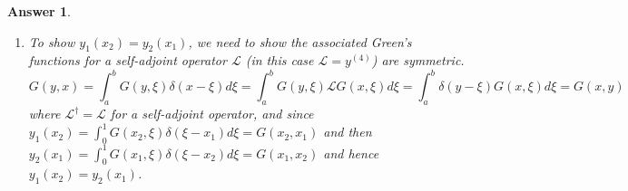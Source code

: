 \documentclass[a4paper]{article}
\newtheorem{ans}{Answer}[section]
\theoremstyle{new}
\begin{document}
\begin{ans}
\begin{enumerate}[label=(\roman*)]
$$\begin{pmatrix}-1&0&1&0&0&0\\0&0&1&1&1&1\\0&0&3&2&1&0\\0&1&0&-1&0&0\\-\xi^3&-\xi^2&\xi^3&\xi^2&\xi&1\\-3\xi^2&-2\xi&3\xi^2&2\xi&1&0\\\end{pmatrix}\begin{pmatrix}c_1\\c_2\\c_5\\c_6\\c_7\\c_8\\\end{pmatrix}=\begin{pmatrix}1/6\\0\\0\\\xi/2\\0\\0\\\end{pmatrix}\implies\begin{pmatrix}c_1\\c_2\\c_5\\c_6\\c_7\\c_8\\\end{pmatrix}=\begin{pmatrix}\frac{1}{6}(-1+3\xi^2-2\xi^3)\\\frac{1}{2}(\xi-2\xi^2+\xi^3)\\\frac{1}{6}(3\xi^2-2\xi^3)\\\frac{1}{2}(-2\xi^2+\xi^3)\\\xi^2/2\\-\xi^3/6\\\end{pmatrix}$$
hence
$$G(x,\xi)=
\left\{
        \begin{array}{ll}
      \frac{1}{6}(-1+3\xi^2-2\xi^3)x^3+\frac{1}{2}(\xi-2\xi^2+\xi^3)x^2 & 0\leq x<\xi\leq 1 \\
      \frac{1}{6}(3\xi^2-2\xi^3)x^3+\frac{1}{2}(-2\xi^2+\xi^3)x^2+\frac{1}{2}\xi^2x-\frac{1}{6}\xi^3& 0\leq \xi<x\leq 1
        \end{array}
    \right.$$
which simplifies to their desired result.
\item To show $y_1(x_2)=y_2(x_1)$, we need to show the associated Green's functions for a self-adjoint operator $\mathcal{L}$ (in this case $\mathcal{L}=y^{(4)}$) are symmetric.
$$G(y,x)=\int_a^bG(y,\xi)\delta(x-\xi)d\xi=\int_a^bG(y,\xi)\mathcal{L}G(x,\xi)d\xi=\int_a^b\delta(y-\xi)G(x,\xi)d\xi=G(x,y)$$
where $\mathcal{L}^\dag=\mathcal{L}$ for a self-adjoint operator, and since $y_1(x_2)=\int_0^1G(x_2,\xi)\delta(\xi-x_1)d\xi=G(x_2,x_1)$ and then $y_2(x_1)=\int_0^1G(x_1,\xi)\delta(\xi-x_2)d\xi=G(x_1,x_2)$ and hence $y_1(x_2)=y_2(x_1)$.
\end{enumerate}
\end{ans}
\end{document}
